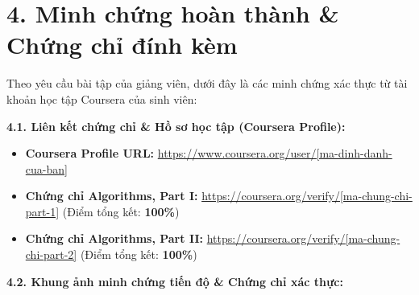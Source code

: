 \documentclass[11pt, a4paper]{article}
\begin{document}
\vspace{0.5cm}

\section*{\color{primary}4. Minh chứng hoàn thành \& Chứng chỉ đính kèm}
\vspace{-0.2cm}
Theo yêu cầu bài tập của giảng viên, dưới đây là các minh chứng xác thực từ tài khoản học tập Coursera của sinh viên:

\vspace{0.3cm}

\noindent\textbf{4.1. Liên kết chứng chỉ \& Hồ sơ học tập (Coursera Profile):}
\begin{itemize}
    \item \textbf{Coursera Profile URL:} \url{https://www.coursera.org/user/[ma-dinh-danh-cua-ban]}
    \item \textbf{Chứng chỉ Algorithms, Part I:} \url{https://coursera.org/verify/[ma-chung-chi-part-1]} (Điểm tổng kết: \textbf{100\%})
    \item \textbf{Chứng chỉ Algorithms, Part II:} \url{https://coursera.org/verify/[ma-chung-chi-part-2]} (Điểm tổng kết: \textbf{100\%})
\end{itemize}

\vspace{0.3cm}

\noindent\textbf{4.2. Khung ảnh minh chứng tiến độ \& Chứng chỉ xác thực:}

\vspace{0.2cm}

\begin{center}
\end{center}

\vspace{0.3cm}
\end{document}
